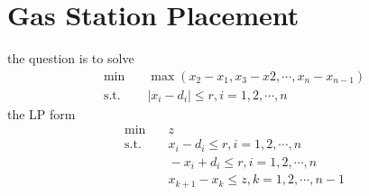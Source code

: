 \section{Gas Station Placement}
the question is to solve
\[
	\begin{split}
		\min &\quad \max(x_2-x_1, x_3-x2, \cdots, x_n - x_{n-1}) \\
	    \text{s.t.} &\quad |x_i - d_i| \leq r, i = 1,2,\cdots, n
	\end{split} 
\]
the LP form
\[
	\begin{split}
		\min &\quad z \\
		\text{s.t.} &\quad  x_i - d_i \leq r, i = 1,2,\cdots, n \\
		&\quad -x_i + d_i \leq r , i = 1,2,\cdots, n\\
		&\quad x_{k+1} - x_k \leq z, k = 1,2,\cdots, n-1
	\end{split} 
\]

